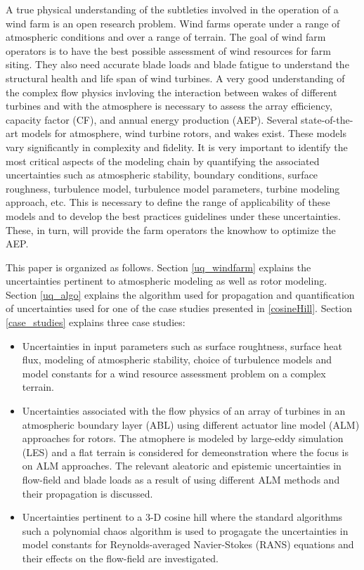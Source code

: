 \documentclass[]{aiaa-tc}%
\begin{document}
A true physical understanding of the subtleties involved in the operation of a wind farm is an open research problem. Wind farms operate under a range of atmospheric conditions and over a range of terrain. The goal of wind farm operators is to have the best possible assessment of wind resources for farm siting. They also need accurate blade loads and blade fatigue to understand the structural health and life span of wind turbines. A very good understanding of the complex flow physics invloving the interaction between wakes of different turbines and with the atmosphere is necessary to assess the array efficiency, capacity factor (CF), and annual energy production (AEP). Several state-of-the-art models for atmosphere, wind turbine rotors, and wakes exist. These models vary significantly in complexity and fidelity. It is very important to identify the most critical aspects of the modeling chain by quantifying the associated uncertainties such as atmospheric stability, boundary conditions, surface roughness, turbulence model, turbulence model parameters, turbine modeling approach, etc. This is necessary to define the range of applicability of these models and to develop the best practices guidelines under these uncertainties. These, in turn, will provide the farm operators the knowhow to optimize the AEP. 

This paper is organized as follows. Section \ref{uq_windfarm} explains the uncertainties pertinent to atmospheric modeling as well as rotor modeling. 
Section \ref{uq_algo} explains the algorithm used for propagation and quantification of uncertainties used for one of the case studies presented in \ref{cosineHill}. Section \ref{case_studies} explains three case studies:
\begin{itemize}
  \item Uncertainties in input parameters such as surface roughtness, surface heat flux, modeling of atmospheric stability, choice of turbulence models and model constants for a wind resource assessment problem on a complex terrain.
  \item Uncertainties associated with the flow physics of an array of turbines in an atmospheric boundary layer (ABL) using different actuator line model (ALM) approaches for rotors. The atmophere is modeled by large-eddy simulation (LES) and a flat terrain is considered for demeonstration where the focus is on ALM approaches. The relevant aleatoric and epistemic uncertainties in flow-field and blade loads as a result of using different ALM methods and their propagation is discussed.
  \item Uncertainties pertinent to a 3-D cosine hill where the standard algorithms such a polynomial chaos algorithm is used to progagate the uncertainties in model constants for Reynolds-averaged Navier-Stokes (RANS) equations and their effects on the flow-field are investigated.  
\end{itemize}
  
\end{document}
